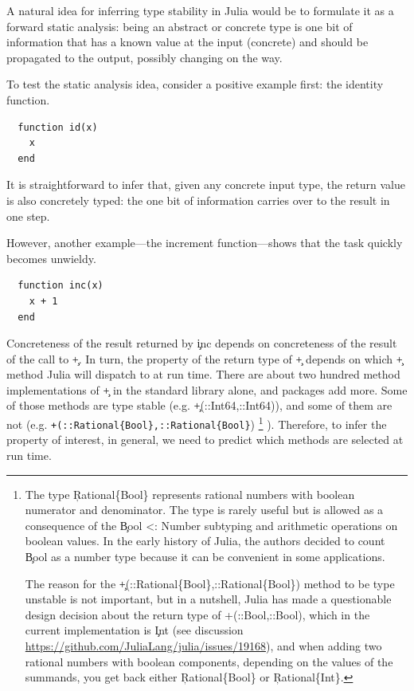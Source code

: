 A natural idea for inferring type stability in Julia would be to formulate it as
a forward static analysis: being an abstract or concrete type is one bit of
information that has a known value at the input (concrete) and should be
propagated to the output, possibly changing on the way.

To test the static analysis idea, consider a positive example first: the
identity function.
\begin{lstlisting}
  function id(x)
    x
  end
\end{lstlisting}
%
It is straightforward to infer that, given any concrete input type, the return
value is also concretely typed: the one bit of information carries over to the
result in one step.

However, another example---the increment function---shows that the task quickly 
becomes unwieldy.
%
\begin{lstlisting}
  function inc(x)
    x + 1
  end
\end{lstlisting}
%
Concreteness of the result returned by \c{inc} depends on concreteness of
the result of the call to \c{+}. In turn, the property of the return type of
\c{+} depends on which \c{+} method Julia will dispatch to at run time.
There are about two hundred method implementations of \c{+} in the standard
library alone, and packages add more. Some of those methods are type stable
(e.g. \c{+(::Int64,::Int64)}), and some of them are not (e.g.
\lstinline|+(::Rational{Bool},::Rational{Bool}|)
\footnote{%
  The type \c{Rational\{Bool\}} represents rational numbers with boolean
  numerator and denominator. The type is rarely useful but is allowed as a
  consequence of the \c{Bool <: Number} subtyping and arithmetic operations on
  boolean values. In the early history of Julia, the authors decided to count
  \c{Bool} as a number type because it can be convenient in some applications.

  The reason for the
  \c{+(::Rational\{Bool\},::Rational\{Bool\})} method to be type
  unstable is not important, but in a nutshell, Julia has made a questionable
  design decision about the return type of \c{{+}(::Bool,::Bool)}, which in the
  current implementation is \c{Int}
  (see discussion \url{https://github.com/JuliaLang/julia/issues/19168}),
  and when adding two rational numbers with boolean components, depending on the
  values of the summands, you get back either \c{Rational\{Bool\}} or
  \c{Rational\{Int\}}.}
).
Therefore,
to infer the property of interest, in general,
we need to predict which methods are selected at run time.

